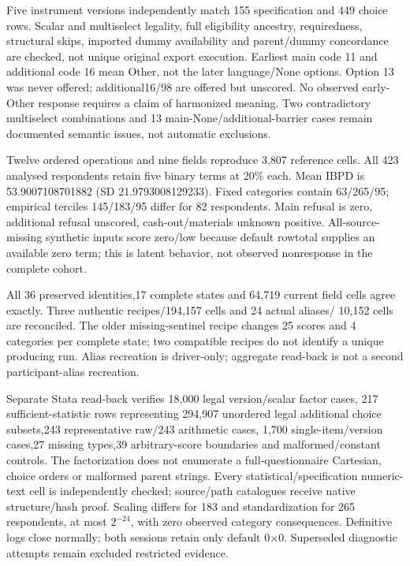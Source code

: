 \documentclass[11pt,a4paper]{article}
\begin{document}
Five instrument versions independently match 155 specification and
449 choice rows. Scalar and multiselect legality, full eligibility ancestry,
requiredness, structural skips, imported dummy availability and
parent/dummy concordance are checked, not unique original export execution.
Earliest main code 11 and additional code 16 mean Other, not the later
language/None options. Option 13 was never offered; additional16/98 are
offered but unscored. No observed early-Other response requires a claim of
harmonized meaning. Two contradictory multiselect combinations and 13
main-None/additional-barrier cases remain documented semantic issues,
not automatic exclusions.

Twelve ordered operations and nine fields reproduce 3,807 reference cells.
All 423 analysed respondents retain five binary terms at 20\% each.
Mean IBPD is 53.9007108701882 (SD 21.9793008129233).
Fixed categories contain 63/265/95; empirical terciles 145/183/95 differ
for 82 respondents. Main refusal is zero, additional refusal unscored,
cash-out/materials unknown positive. All-source-missing synthetic inputs
score zero/low because default rowtotal supplies an available zero term;
this is latent behavior, not observed nonresponse in the complete cohort.

All 36 preserved identities,17 complete states and 64,719 current field cells
agree exactly. Three authentic recipes/194,157 cells and 24 actual aliases/
10,152 cells are reconciled. The older missing-sentinel recipe changes 25
scores and 4 categories per complete state; two compatible recipes do not
identify a unique producing run. Alias recreation is driver-only;
aggregate read-back is not a second participant-alias recreation.

Separate Stata read-back verifies 18,000 legal version/scalar factor cases,
217 sufficient-statistic rows representing 294,907 unordered legal additional
choice subsets,243 representative raw/243 arithmetic cases,
1,700 single-item/version cases,27 missing types,39 arbitrary-score boundaries
and malformed/constant controls. The factorization does not enumerate a
full-questionnaire Cartesian, choice orders or malformed parent strings.
Every statistical/specification numeric-text cell is independently checked;
source/path catalogues receive native structure/hash proof.
Scaling differs for 183 and standardization for 265 respondents, at most
$2^{-24}$, with zero observed category consequences.
Definitive logs close normally; both sessions retain only default 0$\times$0.
Superseded diagnostic attempts remain excluded restricted evidence.
\end{document}
